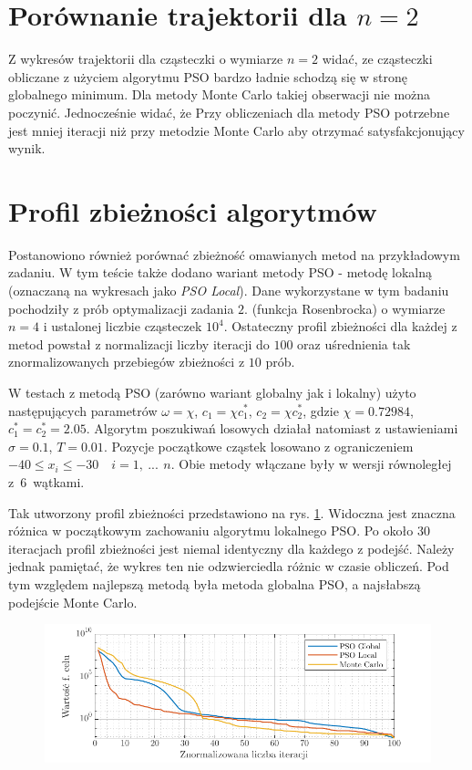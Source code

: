 \documentclass[11pt, a4paper, oneside]{article}
\begin{document}
\section{Porównanie trajektorii dla $n = 2$}
Z wykresów trajektorii dla cząsteczki o wymiarze $n=2$ widać, ze cząsteczki obliczane z użyciem algorytmu PSO bardzo ładnie schodzą się w stronę globalnego minimum. Dla metody Monte Carlo takiej obserwacji nie można poczynić. Jednocześnie widać, że Przy obliczeniach dla metody PSO potrzebne jest mniej iteracji niż przy metodzie Monte Carlo aby otrzymać satysfakcjonujący wynik.

\section{Profil zbieżności algorytmów}

Postanowiono również porównać zbieżność omawianych metod na przykładowym zadaniu. W tym teście także dodano wariant metody PSO - metodę lokalną (oznaczaną na wykresach jako \textit{PSO Local}). Dane wykorzystane w tym badaniu pochodziły z prób optymalizacji zadania $2.$ (funkcja Rosenbrocka) o wymiarze $n = 4$ i ustalonej liczbie cząsteczek $10^{4}$. Ostateczny profil zbieżności dla każdej z metod powstał z normalizacji liczby iteracji do $100$ oraz uśrednienia tak znormalizowanych przebiegów zbieżności z $10$ prób.

W testach z metodą PSO (zarówno wariant globalny jak i lokalny) użyto następujących parametrów $\omega = \chi$, $c_1 = \chi c_1^*$, $c_2 = \chi c_2^*$, gdzie $\chi = 0.72984$, $c_1^* = c_2^* = 2.05$. Algorytm poszukiwań losowych działał natomiast z ustawieniami $\sigma = 0.1$, $T = 0.01$. Pozycje początkowe cząstek losowano z ograniczeniem $-40 \leq x_i \leq -30 \quad i = 1, \ ...\, \ n$. Obie metody włączane były w wersji równoległej z~$6$~wątkami.

Tak utworzony profil zbieżności przedstawiono na rys. \ref{fig:zbieznosc}. Widoczna jest znaczna różnica w początkowym zachowaniu algorytmu lokalnego PSO. Po około $30$ iteracjach profil zbieżności jest niemal identyczny dla każdego z podejść. Należy jednak pamiętać, że wykres ten nie odzwierciedla różnic w czasie obliczeń. Pod tym względem najlepszą metodą była metoda globalna PSO, a najsłabszą podejście Monte Carlo.

\begin{figure}[h]
\centerline{\includegraphics[width=\dimexpr.9\textwidth-1em]{grafiki/zbieznosc_porownanie.pdf}}
\label{fig:zbieznosc}
\end{figure}
\end{document}
